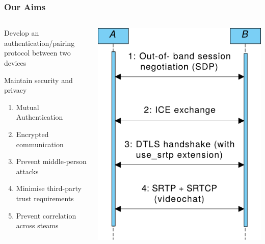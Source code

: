 \documentclass[handout, notes=show]{beamer}
\begin{document}
\begin{frame}
\frametitle{Our Aims}

\begin{columns}[T]
\begin{column}[T]{0.6\textwidth}
\setlength{\parskip}{0.5em}

Develop an authentication/pairing protocol between two devices

Maintain security and privacy

\begin{enumerate}
\item Mutual Authentication
\item Encrypted communication
\item Prevent middle-person attacks
\item Minimise third-party trust requirements
\item Prevent correlation across steams
\end{enumerate}

\end{column}
\begin{column}[T]{0.4\textwidth}
\vspace{2.5em}
\includegraphics[width=1.0\textwidth]{webrtc-simplified-thinner}
\end{column}
\end{columns}

\end{frame}
\end{document}
